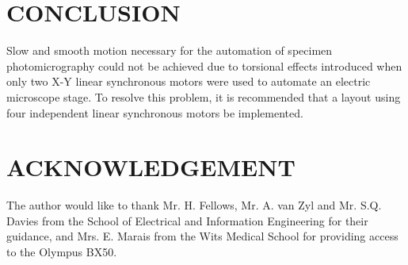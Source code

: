 \documentclass[10pt,twocolumn]{witseiepaper}
\begin{document}
\section{CONCLUSION}

Slow and smooth motion necessary for the automation of specimen
photomicrography could not be achieved due to torsional effects introduced
when only two X-Y linear synchronous motors were used to automate an electric
microscope stage. To resolve this problem, it is recommended that a layout
using four independent linear synchronous motors be implemented.


\section*{ACKNOWLEDGEMENT}

The author would like to thank Mr. H. Fellows, Mr. A. van Zyl and Mr. S.Q.
Davies from the School of Electrical and Information Engineering for their
guidance, and Mrs. E. Marais from the Wits Medical School for providing access
to the Olympus BX50.






\end{document}
